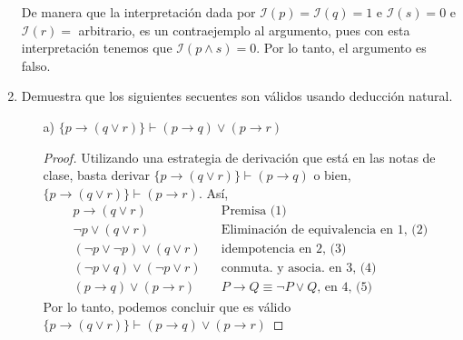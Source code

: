 \documentclass[letterpaper,10pt]{article}
\begin{document}
\begin{enumerate}
        De manera que la interpretación dada por 
        $\mathcal{I}(p) = \mathcal{I}(q) = 1$ e $\mathcal{I}(s) = 0$ e 
        $\mathcal{I}(r) =$ arbitrario, es un contraejemplo al argumento, pues 
        con esta interpretación tenemos que $\mathcal{I}(p \land s) = 0$.
        Por lo tanto, el argumento es falso.

        \item Demuestra que los siguientes secuentes son válidos usando
        deducción natural.
        \begin{itemize}

            \item[a)] $\{ p \rightarrow (q \lor r) \} \vdash
            (p \rightarrow q) \lor (p \rightarrow r)$
            \begin{proof}
                Utilizando una estrategia de derivación que está en las notas 
                de clase, basta derivar 
                $\{ p \rightarrow (q \lor r) \} \vdash (p \rightarrow q)$ o
                bien, $\{ p \rightarrow (q \lor r) \} \vdash 
                (p \rightarrow r)$. Así, 
                \begin{align*}
                    p \rightarrow (q \lor r)
                    && \text{Premisa (1)} \\
                    \neg p \lor (q \lor r)
                    && \text{Eliminación de equivalencia en 1, (2)} \\
                    (\neg p \lor \neg p) \lor (q \lor r)
                    && \text{idempotencia en 2, (3)} \\
                    (\neg p \lor q) \lor (\neg p \lor r)
                    && \text{conmuta. y asocia. en 3, (4)} \\
                    (p \rightarrow q) \lor (p \rightarrow r)
                    && \text{$P \rightarrow Q \equiv \neg P \lor Q$, 
                    en 4, (5)}
                \end{align*}
                Por lo tanto, podemos concluir que es válido 
                $\{ p \rightarrow (q \lor r) \} \vdash
                (p \rightarrow q) \lor (p \rightarrow r)$

            \end{proof}


\end{itemize}
\end{enumerate}
\end{document}

